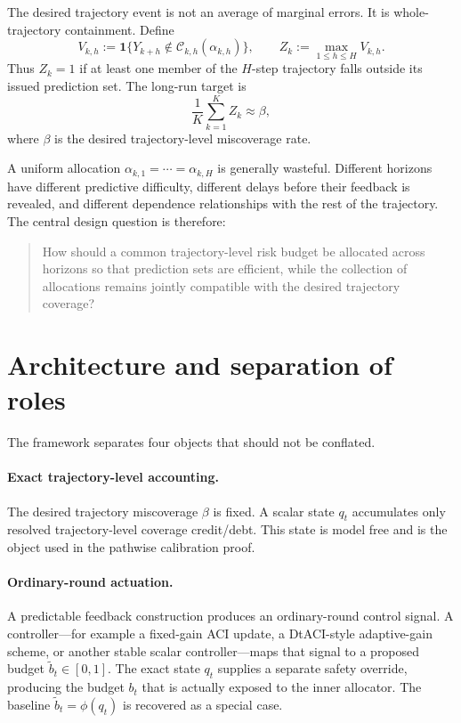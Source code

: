 \documentclass[11pt]{article}
\newcommand{\ind}{\mathbf{1}}
\newcommand{\calC}{\mathcal{C}}
\begin{document}
The desired trajectory event is not an average of marginal errors. It is whole-trajectory containment. Define
\begin{equation}
    V_{k,h}
    :=
    \ind\{Y_{k+h}\notin \calC_{k,h}(\alpha_{k,h})\},
    \qquad
    Z_k
    :=
    \max_{1\le h\le H}V_{k,h}.
    \label{eq:trajectory-failure}
\end{equation}
Thus $Z_k=1$ if at least one member of the $H$-step trajectory falls outside its issued prediction set. The long-run target is
\begin{equation}
    \frac{1}{K}\sum_{k=1}^K Z_k \approx \beta,
    \label{eq:trajectory-target}
\end{equation}
where $\beta$ is the desired trajectory-level miscoverage rate.

A uniform allocation $\alpha_{k,1}=\cdots=\alpha_{k,H}$ is generally wasteful. Different horizons have different predictive difficulty, different delays before their feedback is revealed, and different dependence relationships with the rest of the trajectory. The central design question is therefore:

\begin{quote}
How should a common trajectory-level risk budget be allocated across horizons so that prediction sets are efficient, while the collection of allocations remains jointly compatible with the desired trajectory coverage?
\end{quote}

\section{Architecture and separation of roles}
\label{sec:architecture}

The framework separates four objects that should not be conflated.

\paragraph{Exact trajectory-level accounting.}
The desired trajectory miscoverage $\beta$ is fixed.  A scalar state $q_t$
accumulates only resolved trajectory-level coverage credit/debt.  This state is
model free and is the object used in the pathwise calibration proof.

\paragraph{Ordinary-round actuation.}
A predictable feedback construction produces an ordinary-round control signal.
A controller---for example a fixed-gain ACI update, a DtACI-style adaptive-gain
scheme, or another stable scalar controller---maps that signal to a proposed
budget $\widetilde b_t\in[0,1]$.  The exact state $q_t$ supplies a separate
safety override, producing the budget $b_t$ that is actually exposed to the
inner allocator.  The baseline $\widetilde b_t=\phi(q_t)$ is recovered as a
special case.
\end{document}
